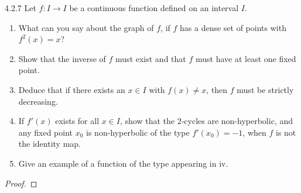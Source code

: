 \begin{problem}{4.2.7}
  Let $f: I \to I$ be a continuous function defined on an interval $I$.

  \begin{enumerate}
    \item What can you say about the graph of $f$, if $f$ has a dense set of
      points with $f^2(x) = x$?
    \item Show that the inverse of $f$ must exist and that $f$ must have at least
      one fixed point.
    \item Deduce that if there exists an $x \in I$ with $f(x) \neq x$, then $f$ must be strictly decreasing.
    \item If $f'(x)$ exists for all $x \in I$, show that the 2-cycles are non-hyperbolic,
      and any fixed point $x_0$ is non-hyperbolic of the type $f'(x_0)=-1$, when $f$ is not the identity map.
    \item Give an example of a function of the type appearing in iv.
  \end{enumerate}
\end{problem}

\begin{proof}
\end{proof}
\newpage
